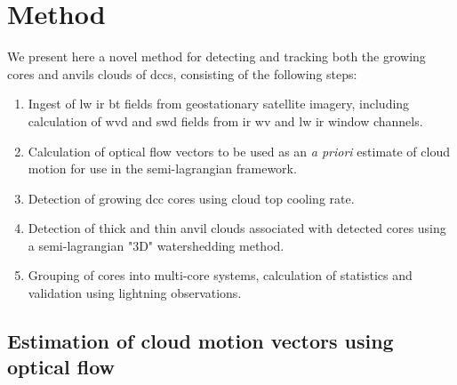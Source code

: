 \section{Method}

We present here a novel method for detecting and tracking both the growing cores and anvils clouds of \acrshort{dcc}s, consisting of the following steps:

\begin{enumerate}
    \item Ingest of \acrshort{lw} \acrshort{ir} \acrshort{bt} fields from geostationary satellite imagery, including calculation of \acrshort{wvd} and \acrshort{swd} fields from \acrshort{ir} \acrshort{wv} and \acrshort{lw} \acrshort{ir} window channels.
    \item Calculation of optical flow vectors to be used as an \textit{a priori} estimate of cloud motion for use in the semi-lagrangian framework.
    \item Detection of growing \acrshort{dcc} cores using cloud top cooling rate.
    \item Detection of thick and thin anvil clouds associated with detected cores using a semi-lagrangian "3D" watershedding method. 
    \item Grouping of cores into multi-core systems, calculation of statistics and validation using lightning observations.
\end{enumerate}



\subsection{Estimation of cloud motion vectors using optical flow}

